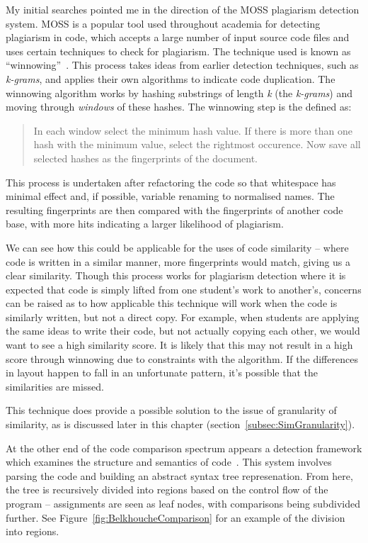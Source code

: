 My initial searches pointed me in the direction of the MOSS plagiarism detection
system. MOSS is a popular tool used throughout academia for detecting plagiarism
in code, which accepts a large number of input source code files and uses certain
techniques to check for plagiarism. The technique used is known as 
``winnowing''~\cite{winnowing}. This process takes ideas from earlier detection
techniques, such as \emph{k-grams}, and applies their own algorithms to indicate
code duplication. The winnowing algorithm works by hashing substrings of length
\emph{k} (the \emph{k-grams}) and moving through \emph{windows} of these hashes.
The winnowing step is the defined as: 
\begin{quote}In each window select the minimum hash value.
If there is more than one hash with the minimum value, select the rightmost
occurence. Now save all selected hashes as the fingerprints of the document.
\cite{winnowing}
\end{quote}

This process is undertaken after refactoring the code so that whitespace
has minimal effect and, if possible, variable renaming to normalised names.
The resulting fingerprints are then compared with the fingerprints of another
code base, with more hits indicating a larger likelihood of plagiarism.

We can see how this could be applicable for the uses of code similarity -- 
where code is written in a similar manner, more fingerprints would match,
giving us a clear similarity. Though this process works for plagiarism detection
where it is expected that code is simply lifted from one student's work to
another's, concerns can be raised as to how applicable this technique will work
when the code is similarly written, but not a direct copy. For example, when 
students are applying the same ideas to write their code, but not actually
copying each other, we would want to see a high similarity score. It is likely
that this may not result in a high score through winnowing due to constraints
with the algorithm. If the differences in layout happen to fall in an unfortunate
pattern, it's possible that the similarities are missed.

This technique does provide a possible solution to the issue of granularity of
similarity, as is discussed later in this chapter (section~\ref{subsec:SimGranularity}).

At the other end of the code comparison spectrum appears a detection framework
which examines the structure and semantics of code~\cite{Belkhouche}. This system
involves parsing the code and building an abstract syntax tree represenation.
From here, the tree is recursively divided into regions based on the control
flow of the program -- assignments are seen as leaf nodes, with comparisons being
subdivided further. See Figure~\ref{fig:BelkhoucheComparison} for an example of
the division into regions.

